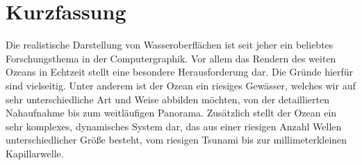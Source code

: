 \chapter*{Kurzfassung}

\textcolor{changed}{
Die realistische Darstellung von Wasseroberflächen ist seit jeher ein beliebtes Forschungsthema in der Computergraphik. Vor allem das Rendern
des weiten Ozeans in Echtzeit stellt eine besondere Herausforderung dar.
Die Gründe hierfür sind vielseitig.
Unter anderem ist der Ozean ein riesiges Gewässer, welches wir auf
sehr unterschiedliche Art und Weise abbilden möchten, von der
detaillierten Nahaufnahme bis zum weitläufigen Panorama.
Zusätzlich stellt der Ozean ein sehr komplexes, dynamisches System
dar, das aus einer riesigen Anzahl Wellen unterschiedlicher Größe
besteht, vom riesigen Tsunami bis zur millimeterkleinen Kapillarwelle.
}

